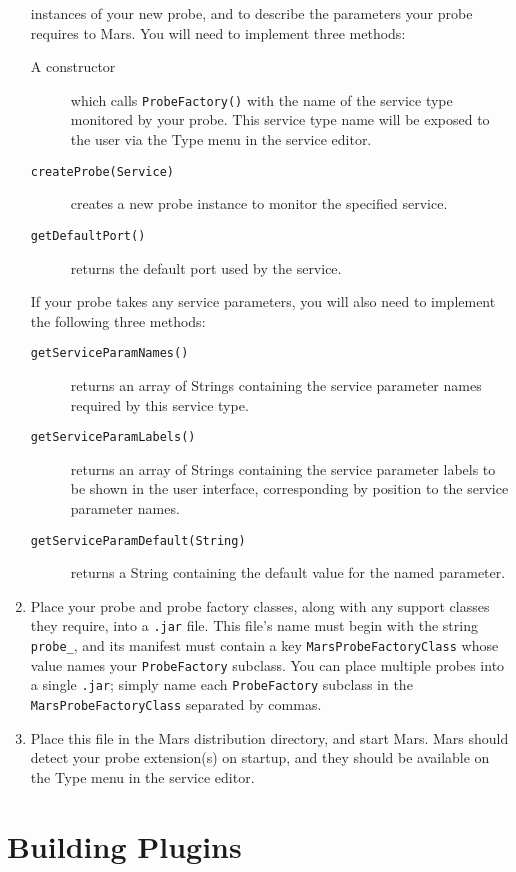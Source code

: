 \documentclass{article}
\newcommand{\filename}[1]{{\tt #1}}
\newcommand{\identifier}[1]{{\tt #1}}
\newcommand{\guiitem}[1]{{\sf #1}}
\begin{document}
\begin{enumerate}
  instances of your new probe, and to describe the parameters your
  probe requires to Mars. You will need to implement three methods:
  \begin{description}
  \item[A constructor] which calls \identifier{ProbeFactory()} with the
    name of the service type monitored by your probe. This service type
    name will be exposed to the user via the \guiitem{Type} menu in the
    service editor.
  \item[\identifier{createProbe(Service)}]creates a new probe instance
    to monitor the specified service.
  \item[\identifier{getDefaultPort()}] returns the default port used by
    the service.
  \end{description}
  If your probe takes any service parameters, you will also need to
  implement the following three methods:
  \begin{description}
  \item[\identifier{getServiceParamNames()}] returns an array of Strings
    containing the service parameter names required by this service
    type.
  \item[\identifier{getServiceParamLabels()}] returns an array of
    Strings containing the service parameter labels to be shown in the
    user interface, corresponding by position to the service parameter
    names.
  \item[\identifier{getServiceParamDefault(String)}] returns a String
    containing the default value for the named parameter.
  \end{description}
\item Place your probe and probe factory classes, along with any
  support classes they require, into a \filename{.jar} file. This
  file's name must begin with the string \filename{probe\_}, and its
  manifest must contain a key \identifier{MarsProbeFactoryClass} whose
  value names your \identifier{ProbeFactory} subclass.  You can place
  multiple probes into a single \filename{.jar}; simply name each
  \identifier{ProbeFactory} subclass in the
  \identifier{MarsProbeFactoryClass} separated by commas.
\item Place this file in the Mars distribution directory, and start
  Mars. Mars should detect your probe extension(s) on startup, and
  they should be available on the \guiitem{Type} menu in the service
  editor.
\end{enumerate}

\section{Building Plugins}
\end{document}
